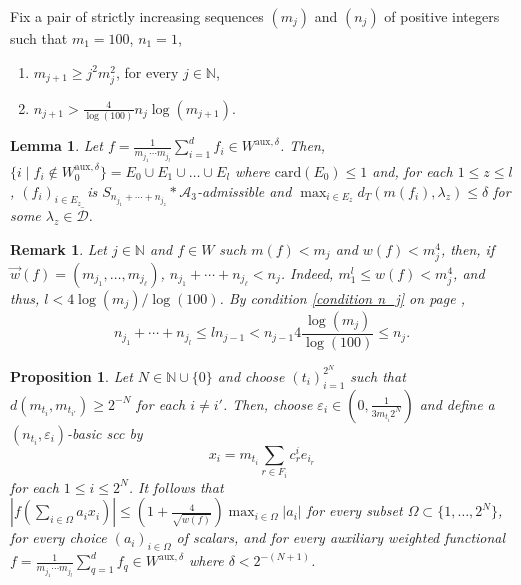 \documentclass[10pt,a4paper]{amsart}
\newtheorem{proposition}{Proposition}
\newtheorem{lemma}{Lemma}
\newtheorem{remark}{Remark}
\newcommand{\N}{\mathbb{N}}
\newcommand{\bes}{\begin{equation*}}
\newcommand{\ees}{\end{equation*}}
\newcommand{\ep}{\varepsilon}
\begin{document}
Fix a pair of strictly increasing sequences $(m_{j})$ and $(n_{j})$ of positive integers such that $m_{1}=100$, $n_{1}=1$,
\begin{enumerate}[label=(\arabic*)]
\item\label{condition m_j} $m_{j+1}\geq j^2m_j^2$, for every $j\in\N$,
\item\label{condition n_j} $n_{j+1}>\frac{4}{\log(100)}n_{j}\log(m_{j+1})$.
\end{enumerate}

\begin{lemma}{\label{aux_lemma}}
Let $f=\frac{1}{m_{j_{1}}\cdots m_{j_{l}}}\sum_{i=1}^{d}f_{i}\in W^{\text{aux},\delta}$. Then, $\{ i \mid f_{i}\notin W^{\text{aux},\delta}_{0}\}=E_{0}\cup E_{1}\cup\ldots\cup E_{l}$ where $\mathrm{card}(E_0)\leq 1$ and, for each $1\leq z\leq l$, $(f_{i})_{i\in E_{z}}$ is $S_{n_{j_{1}}+\cdots+n_{j_{z}}}\ast\mathcal{A}_{3}$-admissible and $\max_{i\in E_{z}}d_{T}(m(f_{i}),\lambda_{z})\leq\delta$ for some $\lambda_{z}\in\overline{\mathcal{D}}$.
\end{lemma}

\begin{remark}
\label{weight-to-admissibility condition}
Let $j\in\N$ and $f\in W$ such  $m(f)<m_j$ and $w(f) < m_j^4$, then, if $\vec w(f)= (m_{j_1},\ldots,m_{j_\ell})$, $n_{j_1}+\cdots +n_{j_\ell} < n_j$. Indeed, $m_{1}^{l}\leq w(f) <m_{j}^{4}$, and thus, $l<4\log(m_{j})/\log(100)$. By condition \ref{condition n_j} on page \pageref{condition n_j},
\[n_{j_{1}}+\cdots+n_{j_{l}}\leq ln_{j-1}< n_{j-1}4\frac{\log(m_{j})}{\log(100)}\leq n_{j}.\]
\end{remark}

\begin{proposition}{\label{c0_type_estimate}}
Let $N\in\N\cup\{0\}$ and choose $(t_{i})_{i=1}^{2^{N}}$ such that $d(m_{t_{i}},m_{t_{i'}})\geq 2^{-N}$ for each $i\neq i'$. Then, choose $\ep_{i}\in\left(0,\frac{1}{3m_{t_{i}}2^{N}}\right)$ and define a $(n_{t_{i}},\ep_{i})$-basic scc by
\bes x_{i}=m_{t_{i}}\sum_{r\in F_{i}}c_{r}^{i}e_{i_{r}} \ees
for each $1\leq i\leq 2^{N}$. It follows that $\left\vert f\left(\sum_{i\in\Omega}a_{i}x_{i}\right)\right\vert\leq \left(1+\frac{4}{\sqrt{w(f)}}\right)\max_{i\in\Omega}|a_{i}|$ for every subset $\Omega\subset\{1,\ldots,2^{N}\}$, for every choice $(a_{i})_{i\in\Omega}$ of scalars, and for every auxiliary weighted functional $f=\frac{1}{m_{j_{1}}\cdots m_{j_{l}}}\sum_{q=1}^{d}f_{q}\in W^{\text{aux},\delta}$ where $\delta<2^{-(N+1)}$.
\end{proposition}
\end{document}
